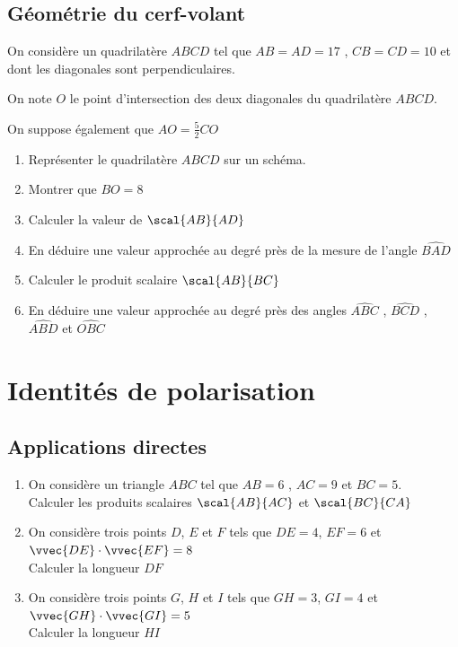 \documentclass[oneside,12pt]{book}          %
\begin{document}
\subsection{Géométrie du cerf-volant}

On considère un quadrilatère $ABCD$ tel que $AB=AD=17$ , $CB=CD=10$ et dont les diagonales sont perpendiculaires.

On note $O$ le point d'intersection des deux diagonales du quadrilatère $ABCD$.

On suppose également que $AO=\frac{5}{2}CO$


\begin{enumerate}
    \item Représenter le quadrilatère $ABCD$ sur un schéma.
    \item Montrer que $BO=8$
    \item Calculer la valeur de $\scal{AB}{AD}$
    \item En déduire une valeur approchée au degré près de la mesure de l'angle $\widehat{BAD}$
    \item Calculer le produit scalaire $\scal{AB}{BC}$
    \item En déduire une valeur approchée au degré près des angles $\widehat{ABC}$ , $\widehat{BCD}$ , $\widehat{ABD}$ et $\widehat{OBC}$
\end{enumerate}



\section{Identités de polarisation}


\subsection{Applications directes}

\begin{enumerate}
    \item On considère un triangle $ABC$ tel que $AB=6$ ,  $AC=9$ et $BC=5$.\\
    Calculer les produits scalaires $\scal{AB}{AC}$ et $\scal{BC}{CA}$
    \item On considère trois points $D$, $E$ et $F$ tels que $DE=4$, $EF=6$ et $\vvec{DE}\cdot\vvec{EF}=8$\\
    Calculer la longueur $DF$
    \item On considère trois points $G$, $H$ et $I$ tels que $GH=3$, $GI=4$ et $\vvec{GH}\cdot\vvec{GI}=5$\\
    Calculer la longueur $HI$
\end{enumerate}
\end{document}
